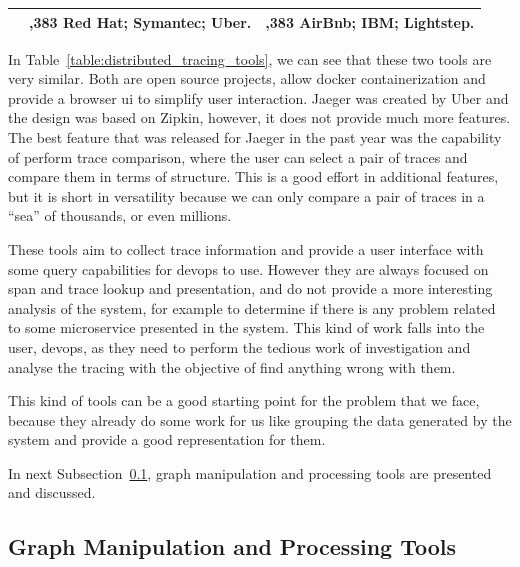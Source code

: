 \begin{table}[]
\begin{tabularx}{\linewidth} {
            >{\hsize=0.234\hsize}X|
            >{\hsize=0,383\hsize}X|
            >{\hsize=0,383\hsize}X|}
         & Red Hat; \newline
        Symantec; \newline
        Uber. \newline
         & AirBnb; \newline
        IBM; \newline
        Lightstep.                                                                                                                                                                                                      \\ \hline
    \end{tabularx}
\end{table}

In Table~\ref{table:distributed_tracing_tools}, we can see that these two tools are very similar. Both are open source projects, allow docker containerization and provide a browser ui to simplify user interaction. Jaeger was created by Uber and the design was based on Zipkin, however, it does not provide much more features. The best feature that was released for Jaeger in the past year was the capability of perform trace comparison, where the user can select a pair of traces and compare them in terms of structure. This is a good effort in additional features, but it is short in versatility because we can only compare a pair of traces in a ``sea'' of thousands, or even millions.

These tools aim to collect trace information and provide a user interface with some query capabilities for \gls{devops} to use. However they are always focused on span and trace lookup and presentation, and do not provide a more interesting analysis of the system, for example to determine if there is any problem related to some microservice presented in the system. This kind of work falls into the user, \gls{devops}, as they need to perform the tedious work of investigation and analyse the tracing with the objective of find anything wrong with them.

This kind of tools can be a good starting point for the problem that we face, because they already do some work for us like grouping the data generated by the system and provide a good representation for them.

In next Subsection~\ref{subsec:graph_manipulation_and_processing_tools}, graph manipulation and processing tools are presented and discussed.

\subsection{Graph Manipulation and Processing Tools}
\label{subsec:graph_manipulation_and_processing_tools}

